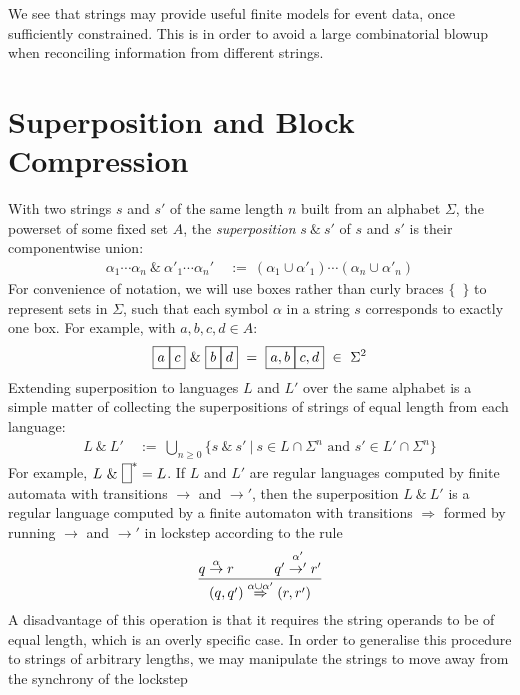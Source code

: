 \documentclass[a4paper,11pt,leqno]{article}
\makeatletter
\newcommand{\vph}[1]{\vphantom{#1}}
\newcommand{\sta}[2]{\stackrel{#1}{#2}}
\newcommand{\ebox}[1]{\fbox{$\vph{',}#1$}}
\newcommand{\eboxb}[1]{\fbox{$\vph{@}#1$}}
\makeatother
\begin{document}
We see that strings may provide useful finite models for event data, once 
sufficiently constrained. This is in order to avoid a large combinatorial 
blowup when reconciling information from different strings.

\section{Superposition and Block Compression}\label{sp and bc}
With two strings $s$ and $s'$ of the same length $n$
built from an alphabet $\Sigma$, the powerset of some fixed set 
$A$,
the \textit{superposition} $s ~\&~ s'$ of $s$ and $s'$ is their componentwise 
union:
\begin{align}
\alpha_1\cdots\alpha_n \ \&\ 
\alpha'_1\cdots\alpha_n' & \ :=\
(\alpha_1\cup\alpha'_1)\cdots(\alpha_n\cup\alpha'_n)
\end{align}
For convenience of notation, we will use boxes rather than curly braces 
$\{$~$\}$ to represent sets in $\Sigma$, such that each symbol $\alpha$ in a 
string $s$ corresponds to exactly one box. For example, with $a, b, c, d \in 
A$:
\begin{align}
\ebox{a}\ebox{c} \ \& \ \ebox{b}\ebox{d} \ = \
\ebox{a, b}\ebox{c, d} \ \in\ \Sigma^2
\end{align}
Extending superposition to languages $L$ and $L'$ over the same alphabet is a 
simple matter of 
collecting the superpositions of strings of equal length from each language: 
\begin{align}
L ~\&~ L' & \ :=\ \bigcup_{n\geq 0}
\{s~\&~s'\ | \ s\in L\cap \Sigma^n\mbox{ and }s'\in L'\cap \Sigma^n\}
\end{align}
For example, $L ~\&~ \eboxb{}^\ast = L$.
If $L$ and $L'$ are regular languages computed by finite automata
with transitions $\to$ and $\to'$, then the superposition $L~\&~ L'$ is
a regular language computed by a finite automaton with transitions
$\Rightarrow$
formed by running $\to$ and $\to'$ in lockstep
according to the rule 
\begin{align}
\frac{q \sta{\alpha}{\to} r   \hspace{.4in} q' \sta{\alpha'}{\to'} r'}{
	(q,q') \sta{\alpha\cup\alpha'}{\Rightarrow} (r,r')}
\end{align}
A disadvantage of this operation is that it requires the string operands to be 
of equal length, which is an overly specific case. In order to generalise this 
procedure to strings of arbitrary lengths, we may 
manipulate the strings to move away from the synchrony of the lockstep 
\end{document}
